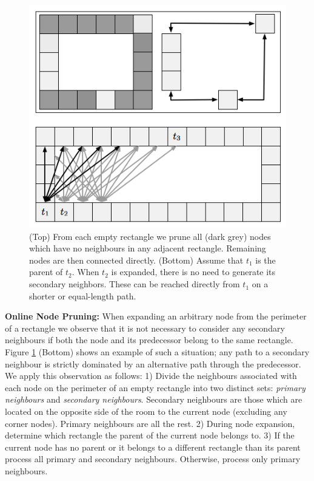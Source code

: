 \begin{figure}[t]
	\begin{center}
	\includegraphics[scale=0.45, trim = 10mm 10mm 10mm 0mm]
	{diagrams/branching.png}
	\end{center}
	\vspace{-3pt}
	\caption{(Top) From each empty rectangle we prune all (dark grey) nodes which
	have no neighbours in any adjacent rectangle.
	Remaining nodes are then connected directly.
	(Bottom) Assume that $t_{1}$ is the parent of $t_2$. When $t_2$
	is expanded, there is no need to generate its secondary neighbors.
	These can be reached directly from $t_1$ on a shorter or equal-length path.
}
\label{fig-branching}
\end{figure}

\noindent
\textbf{Online Node Pruning:} 
When expanding an arbitrary node from the perimeter of a rectangle we observe
that it is not necessary to consider any secondary neighbours if both the node
and its predecessor belong to the same rectangle. Figure \ref{fig-branching}
(Bottom) shows an example of such a situation; any path to a secondary neighbour
is strictly dominated by an alternative path through the predecessor.  We apply
this observation as follows: 1) {Divide the neighbours associated with each node
on the perimeter of an empty rectangle into two distinct sets: \emph{primary
neighbours} and \emph{secondary neighbours}.  Secondary neighbours are those
which are located on the opposite side of the room to the current node
(excluding any corner nodes).  Primary neighbours are all the rest.} 2) {During
node expansion, determine which rectangle the parent of the current node belongs
to.} 3) {If the current node has no parent or it belongs to a different
rectangle than its parent process all primary and secondary neighbours.
Otherwise, process only primary neighbours.}

